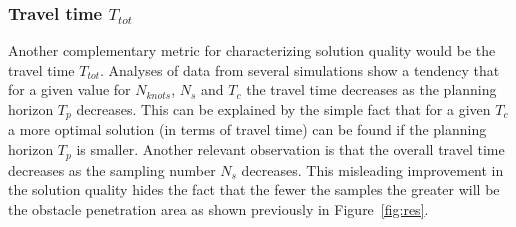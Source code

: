 \documentclass[eprint]{actapoly}
\begin{document}
\subsubsection{Travel time $T_{tot}$}
%
Another complementary metric for characterizing solution quality would be the travel time
$T_{tot}$. Analyses of data from several simulations show a tendency that for a given value 
for $N_{knots}$, $N_s$ and $T_c$ the travel time decreases as the planning horizon $T_p$ decreases.
This can be explained by the simple fact that for a given $T_c$ a more optimal solution (in terms of travel time) can be found if the planning horizon $T_p$ is smaller.
%        
Another relevant observation is that the overall travel time decreases as the sampling 
number $N_s$ decreases. This misleading improvement in the solution quality hides the fact 
that the fewer the samples the greater will be the obstacle penetration area as shown previously in Figure~\ref{fig:res}.
\end{document}
